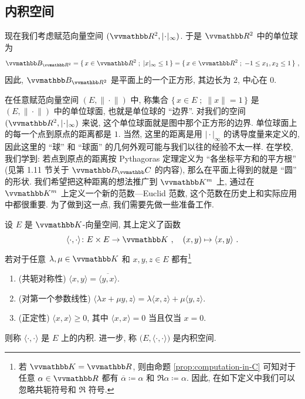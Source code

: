 \subsection{内积空间}

现在我们考虑赋范向量空间 \((\R^2, |\!\cdot\!|_\infty)\). 于是 \(\R^2\) 中的单位球为
\[
    \B_{\R^2} = \{\, x \in \R^2 \;;\; |x|_\infty \leq 1 \,\} = \{\, x \in \R^2 \;;\; -1 \leq x_1, x_2 \leq 1 \,\}\ ,
\]
因此, \(\B_{\R^2}\) 是平面上的一个正方形, 其边长为 \(2\), 中心在 \(0\).
\begin{center}
\end{center}
在任意赋范向量空间 \((E, \|\!\cdot\!\|)\) 中, 称集合 \(\{\, x \in E \;;\; \|x\| = 1 \,\}\) 是 \((E, \|\!\cdot\!\|)\) 中的单位球面, 也就是单位球的 ``边界''. 对我们的空间 \((\R^2, |\!\cdot\!|_\infty)\) 来说, 这个单位球面就是图中那个正方形的边界. 单位球面上的每一个点到原点的距离都是 \(1\). 当然, 这里的距离是用 \(|\!\cdot\!|_\infty\) 的诱导度量来定义的, 因此这里的 ``球'' 和 ``球面'' 的几何外观可能与我们以往的经验不太一样. 在学校, 我们学到: 若点到原点的距离按 Pythagoras 定理定义为 ``各坐标平方和的平方根'' (见第 1.11 节关于 \(\B_\C\) 的内容), 那么在平面上得到的就是 ``圆'' 的形状. 我们希望把这种距离的想法推广到 \(\K^m\) 上, 通过在 \(\K^m\) 上定义一个新的范数---Euclid 范数, 这个范数在历史上和实际应用中都很重要. 为了做到这一点, 我们需要先做一些准备工作.

\begin{axiom}[内积]\label{ax:inner-product}
    设 \(E\) 是 \(\K\)-向量空间, 其上定义了函数
    \[
        \langle \cdot, \cdot \rangle \colon E \times E \to \K\ ,\quad (x, y) \mapsto \langle x, y \rangle\ .
    \]
    若对于任意 \(\lambda, \mu \in \K\) 和 \(x, y, z \in E\) 都有\footnote{若 \(\K = \R\), 则由命题 \ref{prop:computation-in-C} 可知对于任意 \(\alpha \in \R\) 都有 \(\overline \alpha \coloneqq \alpha\) 和 \(\Re \alpha \coloneqq \alpha\). 因此, 在如下定义中我们可以忽略共轭符号和 \(\Re\) 符号.}
    \begin{enumerate}[label={\((\mathrm{IP}_{\arabic*})\)}]
        \item (共轭对称性) \(\langle x, y \rangle = \overline{\langle y, x \rangle}\).
        \item (对第一个参数线性) \(\langle \lambda x + \mu y, z\rangle = \lambda \langle x, z \rangle + \mu \langle y, z \rangle\).
        \item (正定性) \(\langle x, x \rangle \geq 0\), 其中 \(\langle x, x \rangle = 0\) 当且仅当 \(x = 0\).
    \end{enumerate}
    则称 \(\langle \cdot, \cdot \rangle\) 是 \(E\) 上的内积. 进一步, 称 \(\bigl(E, \langle \cdot, \cdot \rangle\bigr)\) 是内积空间.
\end{axiom}

